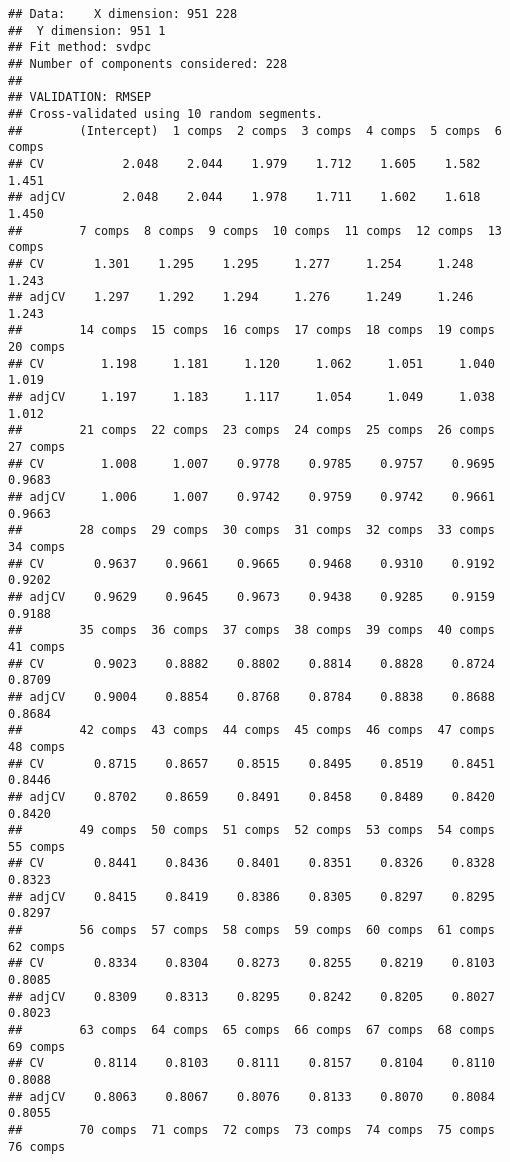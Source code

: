 \documentclass[
]{article}
\begin{document}
\begin{verbatim}
## Data:    X dimension: 951 228 
##  Y dimension: 951 1
## Fit method: svdpc
## Number of components considered: 228
## 
## VALIDATION: RMSEP
## Cross-validated using 10 random segments.
##        (Intercept)  1 comps  2 comps  3 comps  4 comps  5 comps  6 comps
## CV           2.048    2.044    1.979    1.712    1.605    1.582    1.451
## adjCV        2.048    2.044    1.978    1.711    1.602    1.618    1.450
##        7 comps  8 comps  9 comps  10 comps  11 comps  12 comps  13 comps
## CV       1.301    1.295    1.295     1.277     1.254     1.248     1.243
## adjCV    1.297    1.292    1.294     1.276     1.249     1.246     1.243
##        14 comps  15 comps  16 comps  17 comps  18 comps  19 comps  20 comps
## CV        1.198     1.181     1.120     1.062     1.051     1.040     1.019
## adjCV     1.197     1.183     1.117     1.054     1.049     1.038     1.012
##        21 comps  22 comps  23 comps  24 comps  25 comps  26 comps  27 comps
## CV        1.008     1.007    0.9778    0.9785    0.9757    0.9695    0.9683
## adjCV     1.006     1.007    0.9742    0.9759    0.9742    0.9661    0.9663
##        28 comps  29 comps  30 comps  31 comps  32 comps  33 comps  34 comps
## CV       0.9637    0.9661    0.9665    0.9468    0.9310    0.9192    0.9202
## adjCV    0.9629    0.9645    0.9673    0.9438    0.9285    0.9159    0.9188
##        35 comps  36 comps  37 comps  38 comps  39 comps  40 comps  41 comps
## CV       0.9023    0.8882    0.8802    0.8814    0.8828    0.8724    0.8709
## adjCV    0.9004    0.8854    0.8768    0.8784    0.8838    0.8688    0.8684
##        42 comps  43 comps  44 comps  45 comps  46 comps  47 comps  48 comps
## CV       0.8715    0.8657    0.8515    0.8495    0.8519    0.8451    0.8446
## adjCV    0.8702    0.8659    0.8491    0.8458    0.8489    0.8420    0.8420
##        49 comps  50 comps  51 comps  52 comps  53 comps  54 comps  55 comps
## CV       0.8441    0.8436    0.8401    0.8351    0.8326    0.8328    0.8323
## adjCV    0.8415    0.8419    0.8386    0.8305    0.8297    0.8295    0.8297
##        56 comps  57 comps  58 comps  59 comps  60 comps  61 comps  62 comps
## CV       0.8334    0.8304    0.8273    0.8255    0.8219    0.8103    0.8085
## adjCV    0.8309    0.8313    0.8295    0.8242    0.8205    0.8027    0.8023
##        63 comps  64 comps  65 comps  66 comps  67 comps  68 comps  69 comps
## CV       0.8114    0.8103    0.8111    0.8157    0.8104    0.8110    0.8088
## adjCV    0.8063    0.8067    0.8076    0.8133    0.8070    0.8084    0.8055
##        70 comps  71 comps  72 comps  73 comps  74 comps  75 comps  76 comps

\end{verbatim}
\end{document}
